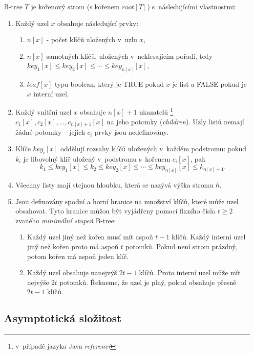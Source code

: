 B-tree $T$ je kořenový strom (s kořenem $root[T]$) s~následujícími
vlastnostmi:
\begin{enumerate}
\item Každý uzel $x$ obsahuje následující prvky:

\begin{enumerate}
\item $n[x]$ - počet klíčů uložených v~uzlu $x$,
\item $n[x]$ samotných klíčů, uložených v~neklesajícím pořadí, tedy $key_{1}[x]\leq key_{2}[x]\leq\cdots\leq key_{n[x]}[x]$,
\item $leaf[x]$ typu boolean, který je TRUE pokud $x$ je list a FALSE
pokud je $x$ interní uzel\@.
\end{enumerate}
\item Každý vnitřní uzel $x$ obsahuje $n[x]+1$ ukazatelů%
\footnote{v~případě jazyka Java \emph{referencí}%
} $c_{1}[x],c_{2}[x],\ldots,c_{n[x]+1}[x]$ na jeho potomky (\emph{children})\@.
Uzly listů nemají žádné potomky -- jejich $c_{i}$ prvky jsou nedefinovány\@.
\item Klíče $key_{i}[x]$ oddělují rozsahy klíčů uložených v~každém podstromu:
pokud $k_{i}$ je libovolný klíč uložený v~podstromu s~kořenem $c_{i}[x]$,
pak
\[
k_{1}\leq key_{1}[x]\leq k_{2}\leq key_{2}[x]\leq\cdots\leq key_{n[x]}[x]\leq k_{n[x]+1}.
\]

\item Všechny listy mají stejnou hloubku, která se nazývá výška stromu $h$\@.
\item Jsou definovány spodní a horní hranice na množství klíčů, které může
uzel obsahovat\@. Tyto hranice můžou být vyjádřeny pomocí fixního
čísla $t\geq2$ zvaného \emph{minimální stupeň} B-tree:

\begin{enumerate}
\item Každý uzel jiný než kořen musí mít aspoň $t-1$ klíčů\@. Každý interní
uzel jiný než kořen proto má aspoň $t$ potomků\@. Pokud není strom
prázdný, potom kořen má aspoň jeden klíč\@.
\item Každý uzel obsahuje nanejvýš $2t-1$ klíčů\@. Proto interní uzel
může mít nejvýše $2t$ potomků\@. Řekneme, že uzel je plný, pokud
obsahuje přesně $2t-1$ klíčů\@.
\end{enumerate}
\end{enumerate}

\subsection{Asymptotická složitost}

